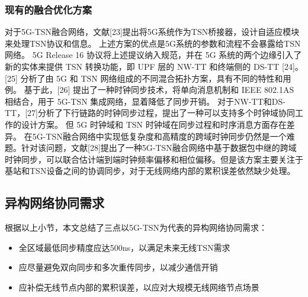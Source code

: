 \documentclass[UTF8,a4paper,12pt]{ctexart}
\numberwithin{equation}{section}
\begin{document}
\subsubsection{现有的融合优化方案}
对于5G-TSN融合网络，文献[23]提出将5G系统作为TSN桥接器，设计自适应模块来处理TSN协议和信息。 上述方案的优点是5G系统的参数和流程不会暴露给TSN网络。 5G Release 16 协议将上述提议纳入规范，并在 5G 系统的两个边缘引入了新的实体来提供 TSN 转换功能，即 UPF 层的 NW-TT 和终端侧的 DS-TT [24]。 [25] 分析了由 5G 和 TSN 网络组成的不同混合拓扑方案，具有不同的特性和用例。 基于此，[26] 提出了一种时钟同步技术，将单向消息机制和 IEEE 802.1AS 相结合，用于 5G-TSN 集成网络，显着降低了同步开销。 对于NW-TT和DS-TT，[27]分析了下行链路的时钟同步过程，提出了一种可以支持多个时钟域协同工作的设计方案。 但 5G 时钟域和 TSN 时钟域在同步过程和时序消息方面存在差异。 在5G-TSN融合网络中实现低复杂度和高精度的跨域时钟同步仍然是一个难题。针对该问题，文献[28]提出了一种5G-TSN融合网络中基于数据包中继的跨域时钟同步，可以联合估计端到端时钟频率偏移和相位偏移。但是该方案主要关注于基站和TSN设备之间的协调同步，对于无线网络内部的累积误差依然缺少处理。
\subsection{异构网络协同需求}
根据以上小节，本文总结了三点以5G-TSN为代表的异构网络协同需求：
\begin{itemize}
	\item 全区域最低同步精度应达500ns，以满足未来无线TSN需求
	\item 应尽量避免双向同步和多次重传同步，以减少通信开销
	\item 应补偿无线节点内部的累积误差，以应对大规模无线网络节点场景
\end{itemize}
\end{document}
